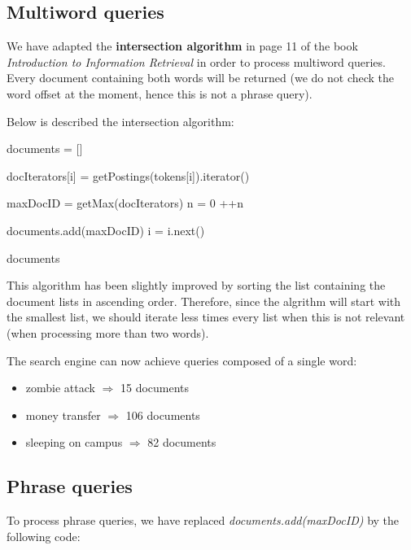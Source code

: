 \subsection{Multiword queries}
We have adapted the \textbf{intersection algorithm} in page 11 of the book \textit{Introduction to Information Retrieval} in order to process multiword queries. Every document containing both words will be returned (we do not check the word offset at the moment, hence this is not a phrase query).

Below is described the intersection algorithm:

\begin{algorithmic}[1]
\State documents = []

    \State docIterators[i] = getPostings(tokens[i]).iterator()
\EndFor

    \State maxDocID = getMax(docIterators)
    \State n = 0
            \State ++n
        \EndIf
    \EndFor
    
     
        \State documents.add(maxDocID)
    \Else {}
                \State i = i.next()
            \EndWhile
        \EndFor
    \EndIf
\EndWhile

\State \Return documents
\end{algorithmic}

This algorithm has been slightly improved by sorting the list containing the document lists in ascending order. Therefore, since the algrithm will start with the smallest list, we should iterate less times every list when this is not relevant (when processing more than two words).


The search engine can now achieve queries composed of a single word:
\begin{itemize}
    \item zombie attack $\Rightarrow$ 15 documents
    \item money transfer $\Rightarrow$ 106 documents
    \item sleeping on campus $\Rightarrow$ 82 documents
\end{itemize}
\pagebreak


\subsection{Phrase queries}
To process phrase queries, we have replaced \textit{documents.add(maxDocID)} by the following code:

